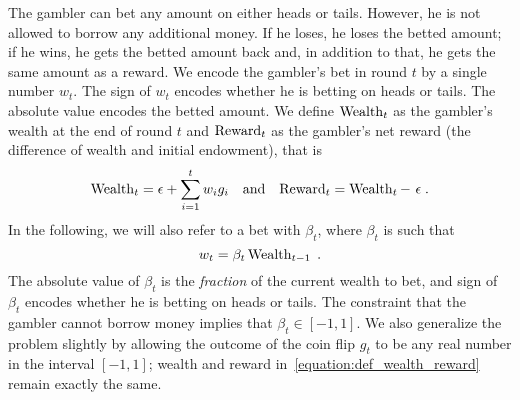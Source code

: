 The gambler can bet any amount on either heads or tails. However, he is not
allowed to borrow any additional money. If he loses, he loses the betted
amount; if he wins, he gets the betted amount back and, in addition to that, he
gets the same amount as a reward.  We encode the gambler's bet in round $t$ by
a single number $w_t$. The sign of $w_t$ encodes whether he is betting on heads
or tails. The absolute value encodes the betted amount.  We define $\operatorname{Wealth}_t$
as the gambler's wealth at the end of round $t$ and $\operatorname{Reward}_t$ as the
gambler's net reward (the difference of wealth and initial endowment), that is
\begin{align}
\label{equation:def_wealth_reward}
\operatorname{Wealth}_t = \epsilon + \sum_{i=1}^t w_i g_i &
& \text{and} &
& \operatorname{Reward}_t = \operatorname{Wealth}_t - \ \epsilon \; .
\end{align}
In the following, we will also refer to a bet with $\beta_t$, where $\beta_t$
is such that
\begin{equation}
\label{equation:def_wt}
w_t = \beta_t \operatorname{Wealth}_{t-1} \; .
\end{equation}
The absolute value of $\beta_t$ is the \emph{fraction} of the current wealth to
bet, and sign of $\beta_t$ encodes whether he is betting on heads or tails. The
constraint that the gambler cannot borrow money implies that $\beta_t \in
[-1,1]$.
We also generalize the problem slightly by allowing the outcome of the coin flip
$g_t$ to be any real number in the interval $[-1,1]$; wealth and reward in~\eqref{equation:def_wealth_reward} remain exactly
the same.
